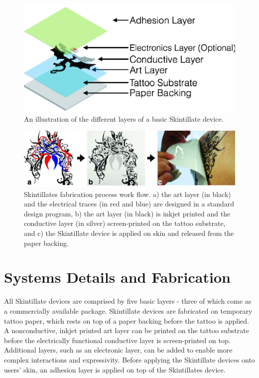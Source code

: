 \documentclass{sigchi}
\begin{document}
\begin{figure}[h]
\centering
\includegraphics[width=0.9\columnwidth]{figures/Figure4}
\caption{An illustration of the different layers of a basic Skintillate device.}
\vspace{-8pt}
\label{fig:layers}
\end{figure}
\begin{figure} [!ht]
\centering
\includegraphics[width=1.0\textwidth]{figures/Figure3}
\caption{Skintillates fabrication process work flow. a) the art layer (in black) and the electrical traces (in red and blue) are designed in a standard design program, b) the art layer (in black) is inkjet printed and the conductive layer (in silver) screen-printed on the tattoo substrate, and c) the Skintillate device is applied on skin and released from  the paper backing.}
\vspace{-8pt}
\label{fig:applicationprocess}
\end{figure}

\section{Systems Details and Fabrication}
 All Skintillate devices are comprised by five basic layers - three of which come as a commercially available package. Skintillate devices are fabricated on temporary tattoo paper, which rests on top of a paper backing before the tattoo is applied. A nonconductive, inkjet printed art layer can be printed on the tattoo substrate before the electrically functional conductive layer is screen-printed on top. Additional layers, such as an electronic layer, can be added to enable more complex interactions and expressivity. Before applying the Skintillate devices onto users' skin, an adhesion layer is applied on top of the Skintillates device. 
\end{document}
